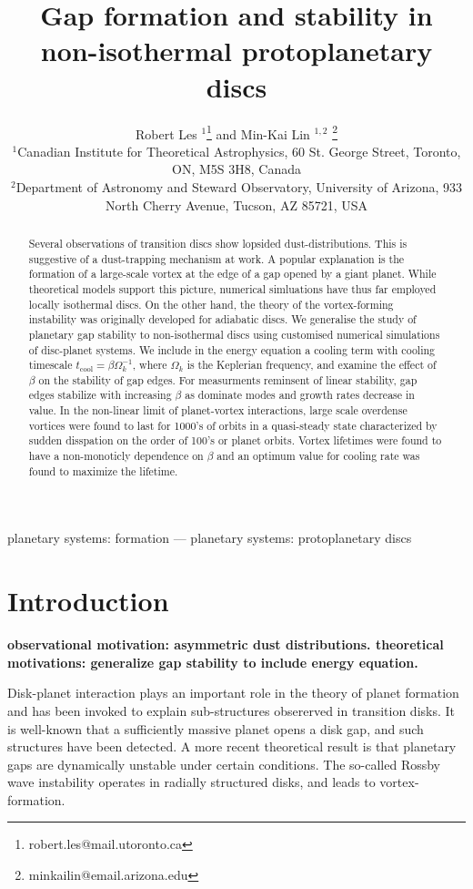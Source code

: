 \documentclass[useAMS,usenatbib]{mn2e}
\title[Gaps in non-isothermal discs]{Gap formation and stability in 
  non-isothermal protoplanetary discs}
\author[Les and Lin]{Robert Les
  $^1$\thanks{robert.les@mail.utoronto.ca} and Min-Kai Lin $^{1,2}$
  \thanks{ minkailin@email.arizona.edu} \\ 
$^1$Canadian Institute for Theoretical Astrophysics,  
60 St. George Street, Toronto, ON, M5S 3H8, Canada \\
$^2$Department of Astronomy and Steward Observatory, University of
Arizona, 933 North Cherry Avenue, Tucson, AZ 85721, USA 
}
\begin{document}
\maketitle
\begin{abstract}
Several observations of transition discs show lopsided
dust-distributions. This is suggestive of a dust-trapping mechanism at work. A
popular explanation is the formation of a large-scale vortex at the
edge of a gap opened by a giant planet. While theoretical models
support this picture, numerical simluations have thus far
employed locally isothermal discs. On the other hand, the theory of the
vortex-forming instability was originally developed for adiabatic
discs. We generalise the study of planetary gap stability to non-isothermal
discs using customised numerical simulations of disc-planet
systems. We include in the energy equation a cooling term with cooling
timescale $t_\mathrm{cool}=\beta\Omega_k^{-1}$, where $\Omega_k$ is
the Keplerian frequency, and examine the effect of $\beta$ on the
stability of gap edges. For measurments reminsent of linear stability, gap edges stabilize with increasing $\beta$ as dominate modes and growth rates decrease in value. In the non-linear limit of planet-vortex interactions, large scale overdense vortices were found to last for 1000's of orbits in a quasi-steady state characterized by sudden disspation on the order of 100's or planet orbits. Vortex lifetimes were found to have a non-monoticly dependence on $\beta$ and an optimum value for cooling rate was found to maximize the lifetime. 


\end{abstract}

\begin{keywords}
planetary systems: formation --- planetary systems:
protoplanetary discs
\end{keywords}


\section{Introduction}\label{intro}
{
\bf 
observational motivation: asymmetric dust distributions. 
theoretical motivations: generalize gap stability to include energy equation. 
}

Disk-planet interaction plays an important role in the theory of planet formation and has been invoked to explain 
sub-structures obsererved in transition disks. It is well-known that a sufficiently massive planet opens a disk gap, and
such structures have been detected. A more recent theoretical result is that planetary gaps are dynamically unstable under
certain conditions. The so-called Rossby wave instability operates in radially structured disks, and leads 
to vortex-formation. 
\end{document}
